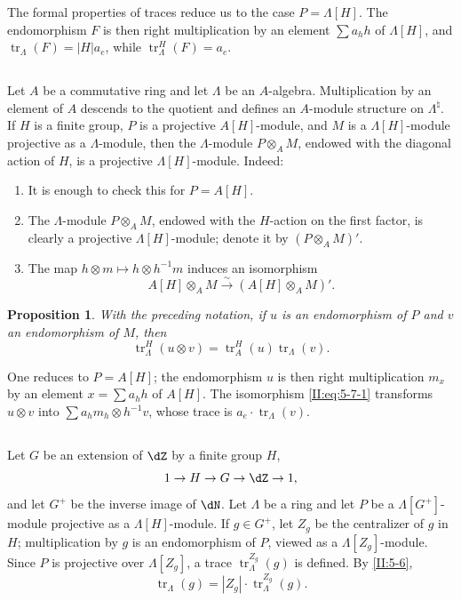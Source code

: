 \documentclass[12pt,oneside,english]{smfbook}
\DeclareMathOperator{\tr}{tr}
\newcommand{\iso}{\xrightarrow\sim}
\newtheorem{proposition_}[subsection]{Proposition}
\begin{document}
The formal properties of traces reduce us to the case $P=\Lambda[H]$. The endomorphism $F$ is then right multiplication by an element $\sum a_hh$ of $\Lambda[H]$, and $\tr_\Lambda(F)=|H|a_e$, while $\tr_\Lambda^H(F)=a_e$.

\subsection{}\label{II:5-7}

Let $A$ be a commutative ring and let $\Lambda$ be an $A$-algebra. Multiplication by an element of $A$ descends to the quotient and defines an $A$-module structure on $\Lambda^\natural$. If $H$ is a finite group, $P$ is a projective $A[H]$-module, and $M$ is a $\Lambda[H]$-module projective as a $\Lambda$-module, then the $\Lambda$-module $P\otimes_AM$, endowed with the diagonal action of $H$, is a projective $\Lambda[H]$-module. Indeed:
\begin{enumerate}[\indent a)]
  \item It is enough to check this for $P=A[H]$.
  \item The $\Lambda$-module $P\otimes_AM$, endowed with the $H$-action on the first factor, is clearly a projective $\Lambda[H]$-module; denote it by $(P\otimes_AM)'$.
  \item The map $h\otimes m\mapsto h\otimes h^{-1}m$ induces an isomorphism
    \begin{equation*}\tag{5.7.1}\label{II:eq:5-7-1}
      A[H]\otimes_A M \iso (A[H]\otimes_A M)' \text{.}
    \end{equation*}
\end{enumerate}

\begin{proposition_}\label{II:5-8}
With the preceding notation, if $u$ is an endomorphism of $P$ and $v$ an endomorphism of $M$, then
\[
  \tr_\Lambda^H(u\otimes v) = \tr_A^H(u)\tr_\Lambda(v) \text{.}
\]
\end{proposition_}

One reduces to $P=A[H]$; the endomorphism $u$ is then right multiplication $m_x$ by an element $x=\sum a_hh$ of $A[H]$. The isomorphism \eqref{II:eq:5-7-1} transforms $u\otimes v$ into $\sum a_hm_h\otimes h^{-1}v$, whose trace is $a_e\cdot\tr_\Lambda(v)$.

\subsection{}\label{II:5-9}

Let $G$ be an extension of $\dZ$ by a finite group $H$,
\[
  1 \to H \to G \to \dZ \to 1 \text{,}
\]
and let $G^+$ be the inverse image of $\dN$. Let $\Lambda$ be a ring and let $P$ be a $\Lambda[G^+]$-module projective as a $\Lambda[H]$-module. If $g\in G^+$, let $Z_g$ be the centralizer of $g$ in $H$; multiplication by $g$ is an endomorphism of $P$, viewed as a $\Lambda[Z_g]$-module. Since $P$ is projective over $\Lambda[Z_g]$, a trace $\tr_\Lambda^{Z_g}(g)$ is defined. By \ref{II:5-6},
\begin{equation*}\tag{5.9.1}\label{II:eq:5-9-1}
  \tr_\Lambda(g) = |Z_g| \cdot \tr_\Lambda^{Z_g}(g) \text{.}
\end{equation*}
\end{document}
